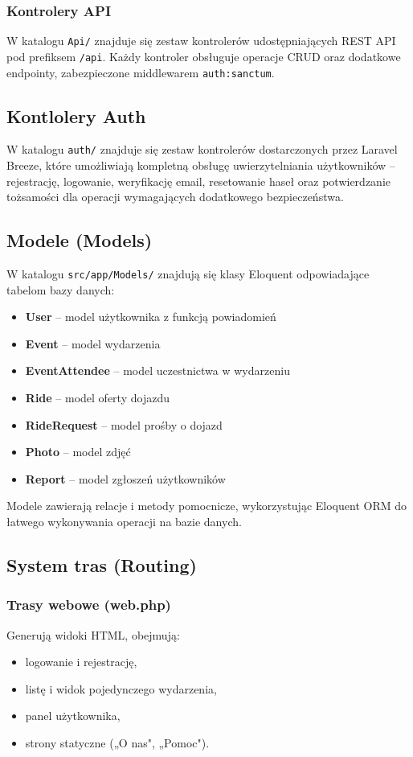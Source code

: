 \documentclass[12pt,a4paper]{article}
\begin{document}
\subsubsection{Kontrolery API}
W katalogu \texttt{Api/} znajduje się zestaw kontrolerów udostępniających REST API pod prefiksem \texttt{/api}. Każdy kontroler obsługuje operacje CRUD oraz dodatkowe endpointy, zabezpieczone middlewarem \texttt{auth:sanctum}.

\subsection{Kontlolery Auth}
W katalogu \texttt{auth/} znajduje się zestaw kontrolerów dostarczonych przez Laravel Breeze, które umożliwiają kompletną obsługę uwierzytelniania użytkowników -- rejestrację, logowanie, weryfikację email, resetowanie haseł oraz potwierdzanie tożsamości dla operacji wymagających dodatkowego bezpieczeństwa.

\subsection{Modele (Models)}

W katalogu \texttt{src/app/Models/} znajdują się klasy Eloquent odpowiadające tabelom bazy danych:

\begin{itemize}[itemsep=2pt]
    \item \textbf{User} -- model użytkownika z funkcją powiadomień
    \item \textbf{Event} -- model wydarzenia
    \item \textbf{EventAttendee} -- model uczestnictwa w wydarzeniu
    \item \textbf{Ride} -- model oferty dojazdu
    \item \textbf{RideRequest} -- model prośby o dojazd
    \item \textbf{Photo} -- model zdjęć
    \item \textbf{Report} -- model zgłoszeń użytkowników
\end{itemize}

Modele zawierają relacje i metody pomocnicze, wykorzystując Eloquent ORM do łatwego wykonywania operacji na bazie danych.

\subsection{System tras (Routing)}

\subsubsection{Trasy webowe (web.php)}
Generują widoki HTML, obejmują:
\begin{itemize}[itemsep=1pt]
    \item logowanie i rejestrację,
    \item listę i widok pojedynczego wydarzenia,
    \item panel użytkownika,
    \item strony statyczne („O nas", „Pomoc").
\end{itemize}
\end{document}
